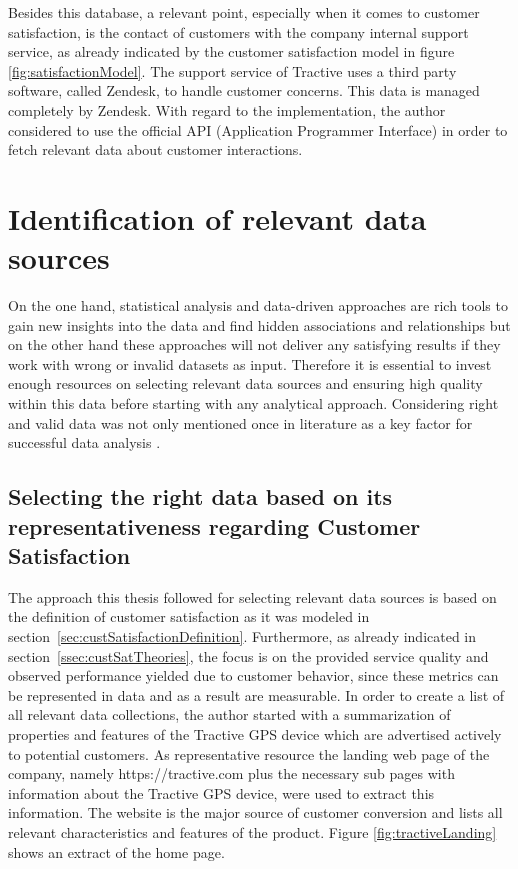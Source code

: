 Besides this database, a relevant point, especially when it comes to customer satisfaction, is the contact of customers with the company internal support service, as already indicated by the customer satisfaction model in figure \ref{fig:satisfactionModel}. The support service of Tractive uses a third party software, called Zendesk, to handle customer concerns. This data is managed completely by Zendesk. With regard to the implementation, the author considered to use the official API (Application Programmer Interface) in order to fetch relevant data about customer interactions. 

\section{Identification of relevant data sources}
\label{sec:dataSources}
On the one hand, statistical analysis and data-driven approaches are rich tools to gain new insights into the data and find hidden associations and relationships but on the other hand these approaches will not deliver any satisfying results if they work with wrong or invalid datasets as input. Therefore it is essential to invest enough resources on selecting relevant data sources and ensuring high quality within this data before starting with any analytical approach. Considering right and valid data was not only mentioned once in literature as a key factor for successful data analysis \cite{neckel2015}. 

\subsection{Selecting the right data based on its representativeness regarding Customer Satisfaction}
The approach this thesis followed for selecting relevant data sources is based on the definition of customer satisfaction as it was modeled in section~\ref{sec:custSatisfactionDefinition}. Furthermore, as already indicated in section~\ref{ssec:custSatTheories}, the focus is on the provided service quality and observed performance yielded due to customer behavior, since these metrics can be represented in data and as a result are measurable. In order to create a list of all relevant data collections, the author started with a summarization of properties and features of the Tractive GPS device which are advertised actively to potential customers. As representative resource the landing web page of the company, namely https://tractive.com plus the necessary sub pages with information about the Tractive GPS device, were used to extract this information. The website is the major source of customer conversion and lists all relevant characteristics and features of the product. Figure \ref{fig:tractiveLanding} shows an extract of the home page.

